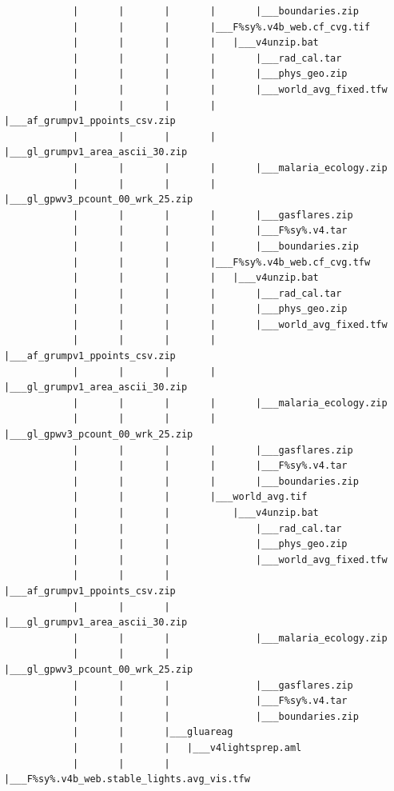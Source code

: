\documentclass[]{book}
\begin{document}
\begin{verbatim}
            |       |       |       |       |___boundaries.zip
            |       |       |       |___F%sy%.v4b_web.cf_cvg.tif
            |       |       |       |   |___v4unzip.bat
            |       |       |       |       |___rad_cal.tar
            |       |       |       |       |___phys_geo.zip
            |       |       |       |       |___world_avg_fixed.tfw
            |       |       |       |       |___af_grumpv1_ppoints_csv.zip
            |       |       |       |       |___gl_grumpv1_area_ascii_30.zip
            |       |       |       |       |___malaria_ecology.zip
            |       |       |       |       |___gl_gpwv3_pcount_00_wrk_25.zip
            |       |       |       |       |___gasflares.zip
            |       |       |       |       |___F%sy%.v4.tar
            |       |       |       |       |___boundaries.zip
            |       |       |       |___F%sy%.v4b_web.cf_cvg.tfw
            |       |       |       |   |___v4unzip.bat
            |       |       |       |       |___rad_cal.tar
            |       |       |       |       |___phys_geo.zip
            |       |       |       |       |___world_avg_fixed.tfw
            |       |       |       |       |___af_grumpv1_ppoints_csv.zip
            |       |       |       |       |___gl_grumpv1_area_ascii_30.zip
            |       |       |       |       |___malaria_ecology.zip
            |       |       |       |       |___gl_gpwv3_pcount_00_wrk_25.zip
            |       |       |       |       |___gasflares.zip
            |       |       |       |       |___F%sy%.v4.tar
            |       |       |       |       |___boundaries.zip
            |       |       |       |___world_avg.tif
            |       |       |           |___v4unzip.bat
            |       |       |               |___rad_cal.tar
            |       |       |               |___phys_geo.zip
            |       |       |               |___world_avg_fixed.tfw
            |       |       |               |___af_grumpv1_ppoints_csv.zip
            |       |       |               |___gl_grumpv1_area_ascii_30.zip
            |       |       |               |___malaria_ecology.zip
            |       |       |               |___gl_gpwv3_pcount_00_wrk_25.zip
            |       |       |               |___gasflares.zip
            |       |       |               |___F%sy%.v4.tar
            |       |       |               |___boundaries.zip
            |       |       |___gluareag
            |       |       |   |___v4lightsprep.aml
            |       |       |       |___F%sy%.v4b_web.stable_lights.avg_vis.tfw

\end{verbatim}
\end{document}
